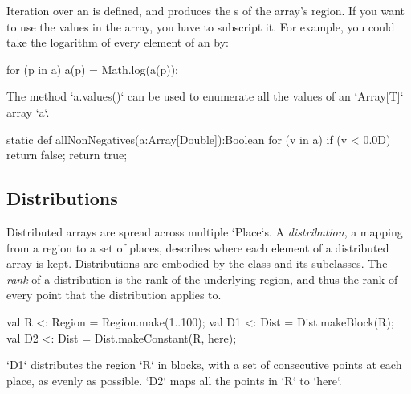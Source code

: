 Iteration over an  is defined, and produces the s of the
array's region.  If you want to use the values in the array, you have to
subscript it.  For example, you could take the logarithm of every element of an
 by: 
\begin{xten}
for (p in a) a(p) = Math.log(a(p));
\end{xten}


The method \xcd`a.values()` can be used to enumerate all the values of an \xcd`Array[T]` array \xcd`a`.
\begin{xten}
static def allNonNegatives(a:Array[Double]):Boolean {
 for (v in a) if (v < 0.0D) return false;
 return true;
}
\end{xten}



\subsection{Distributions}\label{XtenDistributions}

Distributed arrays are spread across multiple \xcd`Place`s.  
A {\em distribution}, a mapping from a region to a set of places, 
describes where each element of a distributed array is kept.
Distributions are embodied by the class  and its
subclasses. 
The {\em rank} of a distribution is the rank of the underlying region, and
thus the rank of every point that the distribution applies to.


\begin{ex}
\begin{xten}
val R  <: Region = Region.make(1..100);
val D1 <: Dist = Dist.makeBlock(R);
val D2 <: Dist = Dist.makeConstant(R, here);
\end{xten}

\xcd`D1` distributes the region \xcd`R` in blocks, with a set of consecutive
points at each place, as evenly as possible.  \xcd`D2` maps all the points in
\xcd`R` to \xcd`here`.  
\end{ex}

